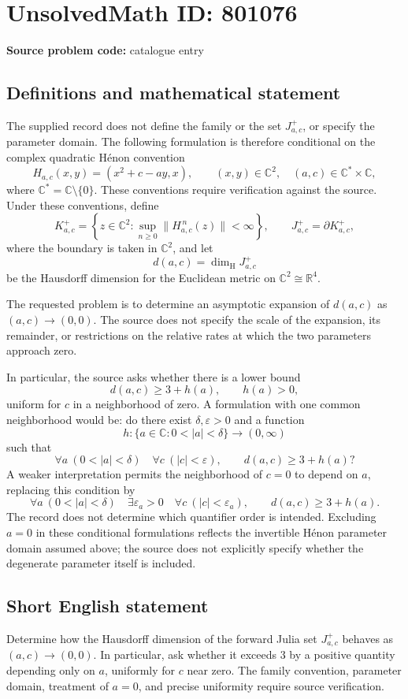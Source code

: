 \documentclass[11pt]{article}
\newcommand{\R}{\mathbb{R}}
\newcommand{\C}{\mathbb{C}}
\begin{document}
\section*{UnsolvedMath ID: 801076}
\textbf{Source problem code:} catalogue entry
\subsection{Definitions and mathematical statement}
The supplied record does not define the family or the set \(J^+_{a,c}\), or specify the parameter domain. The following formulation is therefore conditional on the complex quadratic H\'enon convention
\[
H_{a,c}(x,y)=(x^2+c-ay,x),\qquad (x,y)\in\C^2,\quad (a,c)\in\C^*\times\C,
\]
where \(\C^*=\C\setminus\{0\}\). These conventions require verification against the source. Under these conventions, define
\[
K^+_{a,c}=\left\{z\in\C^2:\sup_{n\geq0}\|H_{a,c}^{\,n}(z)\|<\infty\right\},\qquad
J^+_{a,c}=\partial K^+_{a,c},
\]
where the boundary is taken in \(\C^2\), and let
\[
d(a,c)=\dim_{\mathrm H}J^+_{a,c}
\]
be the Hausdorff dimension for the Euclidean metric on \(\C^2\cong\R^4\).

The requested problem is to determine an asymptotic expansion of \(d(a,c)\) as \((a,c)\to(0,0)\). The source does not specify the scale of the expansion, its remainder, or restrictions on the relative rates at which the two parameters approach zero.

In particular, the source asks whether there is a lower bound
\[
d(a,c)\geq 3+h(a),\qquad h(a)>0,
\]
uniform for \(c\) in a neighborhood of zero. A formulation with one common neighborhood would be: do there exist \(\delta,\varepsilon>0\) and a function
\[
h:\{a\in\C:0<|a|<\delta\}\longrightarrow(0,\infty)
\]
such that
\[
\forall a\ (0<|a|<\delta)\quad\forall c\ (|c|<\varepsilon),\qquad d(a,c)\geq3+h(a)?
\]
A weaker interpretation permits the neighborhood of \(c=0\) to depend on \(a\), replacing this condition by
\[
\forall a\ (0<|a|<\delta)\quad\exists\varepsilon_a>0\quad\forall c\ (|c|<\varepsilon_a),\qquad d(a,c)\geq3+h(a).
\]
The record does not determine which quantifier order is intended. Excluding \(a=0\) in these conditional formulations reflects the invertible H\'enon parameter domain assumed above; the source does not explicitly specify whether the degenerate parameter itself is included.
\subsection{Short English statement}
Determine how the Hausdorff dimension of the forward Julia set \(J^+_{a,c}\) behaves as \((a,c)\to(0,0)\). In particular, ask whether it exceeds \(3\) by a positive quantity depending only on \(a\), uniformly for \(c\) near zero. The family convention, parameter domain, treatment of \(a=0\), and precise uniformity require source verification.
\end{document}
